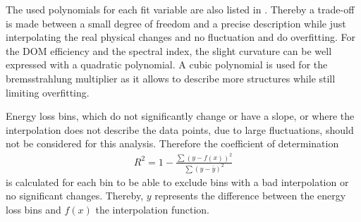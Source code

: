 The used polynomials for each fit variable are also listed in .
Thereby a trade-off is made between a small degree of freedom and a precise description while just interpolating the real physical changes and no fluctuation and do overfitting.
For the DOM efficiency and the spectral index, the slight curvature can be well expressed with a quadratic polynomial.
A cubic polynomial is used for the bremsstrahlung multiplier as it allows to describe more structures while still limiting overfitting.

Energy loss bins, which do not significantly change or have a slope, or where the interpolation does not describe the data points, due to large fluctuations, should not be considered for this analysis.
Therefore the coefficient of determination
\begin{align}
    R^2 = 1 - \frac{\sum (y - f(x))^2}{\sum (y - \bar{y})^2}
\end{align}
is calculated for each bin to be able to exclude bins with a bad interpolation or no significant changes.
Thereby, $y$ represents the difference between the energy loss bins and $f(x)$ the interpolation function.
